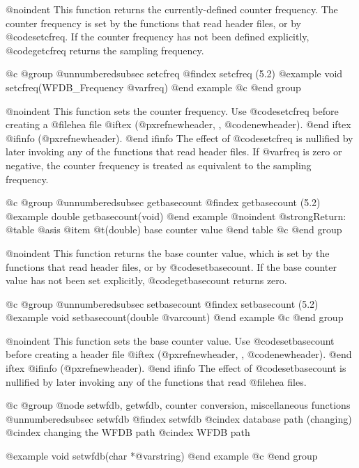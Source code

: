 {{{{{{{{{@noindent
This function returns the currently-defined counter frequency.  The
counter frequency is set by the functions that read header
files, or by @code{setcfreq}.  If the counter frequency has not been
defined explicitly, @code{getcfreq} returns the sampling frequency.

@c @group
@unnumberedsubsec setcfreq
@findex setcfreq (5.2)
@example
void setcfreq(WFDB_Frequency @var{freq})
@end example
@c @end group

@noindent
This function sets the counter frequency.  Use @code{setcfreq}
before creating a @file{hea} file
@iftex
(@pxref{newheader, , @code{newheader}}).
@end iftex
@ifinfo
(@pxref{newheader}).
@end ifinfo
The effect of @code{setcfreq} is nullified by later invoking any of the
functions that read header files.  If @var{freq} is zero or
negative, the counter frequency is treated as equivalent to the sampling
frequency.

@c @group
@unnumberedsubsec getbasecount
@findex getbasecount (5.2)
@example
double getbasecount(void)
@end example
@noindent
@strong{Return:}
@table @asis
@item @t{(double)}
base counter value
@end table
@c @end group

@noindent
This function returns the base counter value, which is set by the
functions that read header files, or by @code{setbasecount}.
If the base counter value has not been set explicitly,
@code{getbasecount} returns zero.

@c @group
@unnumberedsubsec setbasecount
@findex setbasecount (5.2)
@example
void setbasecount(double @var{count})
@end example
@c @end group

@noindent
This function sets the base counter value.  Use @code{setbasecount}
before creating a header file
@iftex
(@pxref{newheader, , @code{newheader}}).
@end iftex
@ifinfo
(@pxref{newheader}).
@end ifinfo
The effect of @code{setbasecount} is nullified by later invoking any of the
functions that read @file{hea} files.

@c @group
@node     setwfdb, getwfdb, counter conversion, miscellaneous functions
@unnumberedsubsec setwfdb
@findex setwfdb
@cindex database path (changing)
@cindex changing the WFDB path
@cindex WFDB path

@example
void setwfdb(char *@var{string})
@end example
@c @end group

}}}}}}}}}
